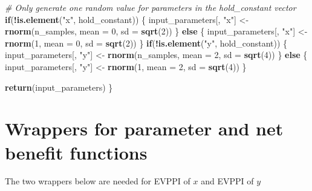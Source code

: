 \documentclass[
]{article}
\newenvironment{Shaded}{\begin{snugshade}}{\end{snugshade}}
\newcommand{\CommentTok}[1]{\textcolor[rgb]{0.56,0.35,0.01}{\textit{#1}}}
\newcommand{\ControlFlowTok}[1]{\textcolor[rgb]{0.13,0.29,0.53}{\textbf{#1}}}
\newcommand{\DataTypeTok}[1]{\textcolor[rgb]{0.13,0.29,0.53}{#1}}
\newcommand{\DecValTok}[1]{\textcolor[rgb]{0.00,0.00,0.81}{#1}}
\newcommand{\KeywordTok}[1]{\textcolor[rgb]{0.13,0.29,0.53}{\textbf{#1}}}
\newcommand{\NormalTok}[1]{#1}
\newcommand{\OperatorTok}[1]{\textcolor[rgb]{0.81,0.36,0.00}{\textbf{#1}}}
\newcommand{\StringTok}[1]{\textcolor[rgb]{0.31,0.60,0.02}{#1}}
\begin{document}
\begin{Shaded}
\begin{Highlighting}[]
  \CommentTok{# Only generate one random value for parameters in the hold_constant vector}
  \ControlFlowTok{if}\NormalTok{(}\OperatorTok{!}\KeywordTok{is.element}\NormalTok{(}\StringTok{"x"}\NormalTok{, hold_constant)) \{}
\NormalTok{    input_parameters[, }\StringTok{"x"}\NormalTok{] <-}\StringTok{ }\KeywordTok{rnorm}\NormalTok{(n_samples, }\DataTypeTok{mean =} \DecValTok{0}\NormalTok{, }\DataTypeTok{sd =} \KeywordTok{sqrt}\NormalTok{(}\DecValTok{2}\NormalTok{))}
\NormalTok{  \} }\ControlFlowTok{else}\NormalTok{ \{}
\NormalTok{    input_parameters[, }\StringTok{"x"}\NormalTok{] <-}\StringTok{ }\KeywordTok{rnorm}\NormalTok{(}\DecValTok{1}\NormalTok{, }\DataTypeTok{mean =} \DecValTok{0}\NormalTok{, }\DataTypeTok{sd =} \KeywordTok{sqrt}\NormalTok{(}\DecValTok{2}\NormalTok{))}
\NormalTok{  \}}
  \ControlFlowTok{if}\NormalTok{(}\OperatorTok{!}\KeywordTok{is.element}\NormalTok{(}\StringTok{"y"}\NormalTok{, hold_constant)) \{}
\NormalTok{    input_parameters[, }\StringTok{"y"}\NormalTok{] <-}\StringTok{ }\KeywordTok{rnorm}\NormalTok{(n_samples, }\DataTypeTok{mean =} \DecValTok{2}\NormalTok{, }\DataTypeTok{sd =} \KeywordTok{sqrt}\NormalTok{(}\DecValTok{4}\NormalTok{))}
\NormalTok{  \} }\ControlFlowTok{else}\NormalTok{ \{}
\NormalTok{    input_parameters[, }\StringTok{"y"}\NormalTok{] <-}\StringTok{ }\KeywordTok{rnorm}\NormalTok{(}\DecValTok{1}\NormalTok{, }\DataTypeTok{mean =} \DecValTok{2}\NormalTok{, }\DataTypeTok{sd =} \KeywordTok{sqrt}\NormalTok{(}\DecValTok{4}\NormalTok{))}
\NormalTok{  \}}
  
  \KeywordTok{return}\NormalTok{(input_parameters)}
\NormalTok{\}}
\end{Highlighting}
\end{Shaded}

\hypertarget{wrappers-for-parameter-and-net-benefit-functions}{%
\section{Wrappers for parameter and net benefit
functions}\label{wrappers-for-parameter-and-net-benefit-functions}}

The two wrappers below are needed for EVPPI of \(x\) and EVPPI of \(y\)
\end{document}
